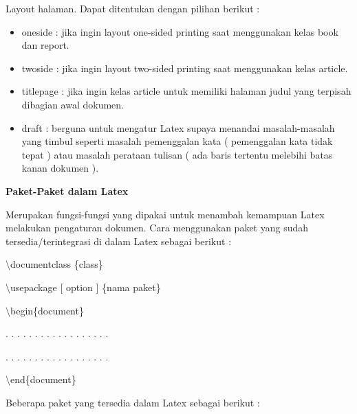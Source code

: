 Layout halaman. Dapat ditentukan dengan pilihan berikut :\par \vspace{12pt}

\begin{itemize}
\item oneside : jika ingin layout one-sided printing saat menggunakan kelas book dan report.
\item twoside : jika ingin layout two-sided printing saat menggunakan kelas article.
\item titlepage : jika ingin kelas article untuk memiliki halaman judul yang terpisah dibagian awal dokumen.
\item draft : berguna untuk mengatur Latex supaya menandai 
masalah-masalah yang timbul seperti masalah pemenggalan kata ( 
pemenggalan kata tidak tepat ) atau masalah perataan tulisan ( ada baris tertentu melebihi batas kanan dokumen ).
\end{itemize}




\textbf{Paket-Paket dalam Latex}\par \vspace{12pt}

Merupakan fungsi-fungsi yang dipakai untuk menambah kemampuan Latex melakukan pengaturan dokumen. Cara menggunakan paket yang sudah tersedia/terintegrasi di dalam Latex sebagai berikut :
\par \vspace{12pt}
$\setminus$documentclass \{class\}\par \vspace{12pt}

$\setminus$usepackage $[$ option $]$ \{nama paket\}\par \vspace{12pt}

$\setminus$begin\{document\}\par \vspace{12pt}

. . . . . . . . . . . . . . . . . .

. . . . . . . . . . . . . . . . . .
\par \vspace{12pt}
$\setminus$end\{document\}\par \vspace{12pt}

Beberapa paket yang tersedia dalam Latex sebagai berikut :

